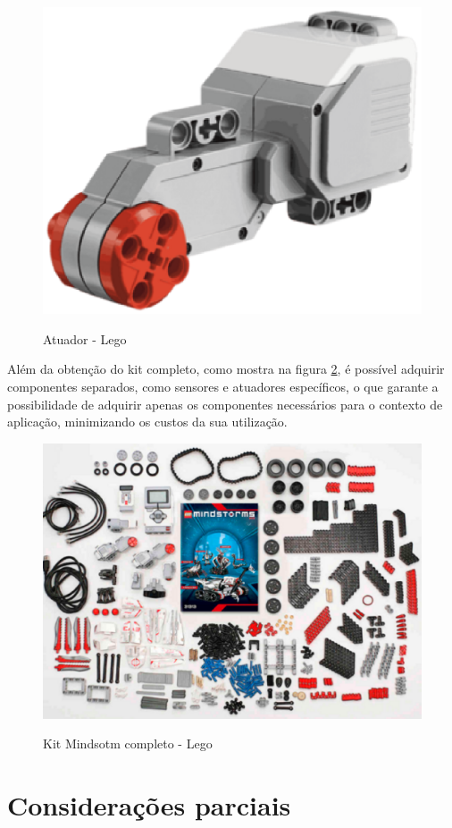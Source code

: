 \begin{figure}[H]
	\centering
	\caption{Atuador - Lego}
	\includegraphics[scale=0.5]{figuras/atuadorLego.eps}
	\label{img:atuadorLego}
\end{figure}

Além da obtenção do kit completo, como mostra na figura \ref{img:kit}, é possível adquirir componentes separados, como sensores e atuadores específicos, o que garante a possibilidade de adquirir apenas os componentes necessários para o contexto de aplicação, minimizando os custos da sua utilização.

\begin{figure}[H]
	\centering
	\caption{Kit Mindsotm completo - Lego}
	\includegraphics[scale=0.7]{figuras/kitLego.eps}
	\label{img:kit}
\end{figure}


\section{Considerações parciais} %
\label{sec:considerações_parciais}

